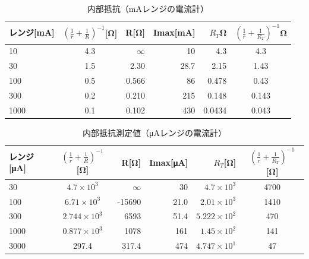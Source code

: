 \documentclass[10pt,a4j,dvipdfmx]{jsarticle}
\begin{document}
\begin{table}[htb]
  \centering
    \caption{内部抵抗（\si{\milli\ampere}レンジの電流計）}
    \begin{tabular}{|l||c|r|r||r|c|} \hline
      レンジ[\si{\milli\ampere}] & $\left(\frac{1}{r}+\frac{1}{R}\right)^{-1}$[\si{\ohm}] & R[\si{\ohm}] & Imax[\si{\milli\ampere}] & $R_{T}$\si{\ohm} & $\left(\frac{1}{r}+\frac{1}{R_{T}}\right)^{-1}$\si{\ohm} \\ \hline \hline
      10 & 4.3 & $\infty$ & 10 & 4.3 & 4.3\\
      30 & 1.5 & 2.30 & 28.7 & 2.15 & 1.43\\
      100 & 0.5 & 0.566 & 86 & 0.478 & 0.43\\ 
      300 & 0.2 & 0.210 & 215 & 0.148 & 0.143\\ 
      1000 & 0.1 & 0.102 & 430 & 0.0434 & 0.043\\ 
      \hline
    \end{tabular}
\end{table}

\begin{table}[htb]
  \centering
    \caption{内部抵抗測定値（\si{\micro\ampere}レンジの電流計）}
    \begin{tabular}{|l||c|r|r||r|c|} \hline
      レンジ[\si{\micro\ampere}] & $\left(\frac{1}{r}+\frac{1}{R}\right)^{-1}$[\si{\ohm}] & R[\si{\ohm}] & Imax[\si{\micro\ampere}] & $R_{T}$[\si{\ohm}] & $\left(\frac{1}{r}+\frac{1}{R_{T}}\right)^{-1}$[\si{\ohm}] \\ \hline \hline
      30 & $4.7\times10^3$ & $\infty$ & 30 & $4.7\times10^3$ & 4700\\
      100 & $6.71\times10^3$ & -15690 & 21.0 & $2.01\times10^3$ & 1410 \\
      300 & $2.744\times10^3$ & 6593 & 51.4 & $5.222\times10^2$ & 470\\
      1000 & $0.877\times10^3$ & 1078 & 161 & $1.45\times10^2$ & 141\\
      3000 & 297.4 & 317.4 & 474 & $4.747\times10^1$ & 47 \\ \hline
    \end{tabular}
\end{table}
\end{document}
